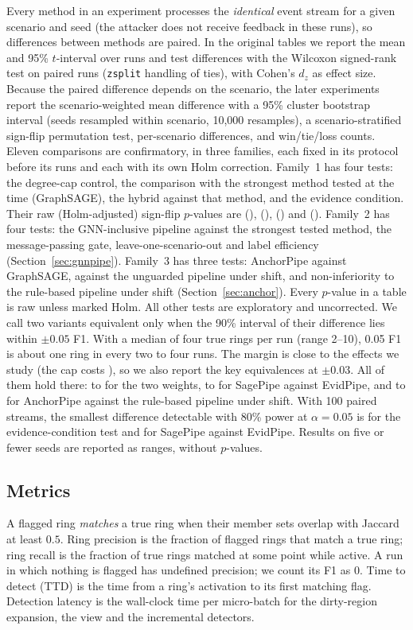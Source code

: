 Every method in an experiment processes the \emph{identical} event stream for a
given scenario and seed (the attacker does not receive feedback in these runs),
so differences between methods are paired. In the original tables we report
the mean and 95\% $t$-interval over runs and test differences with the
Wilcoxon signed-rank test on paired runs (\texttt{zsplit} handling of ties),
with Cohen's $d_z$ as effect size. Because the paired difference depends on the
scenario, the later experiments report the scenario-weighted mean difference
with a 95\% cluster bootstrap interval (seeds resampled within scenario,
10{,}000 resamples), a scenario-stratified sign-flip permutation test, per-scenario
differences, and win/tie/loss counts. Eleven comparisons are confirmatory, in three families, each fixed in its
protocol before its runs and each with its own Holm correction. Family~1 has
four tests: the degree-cap control, the comparison with the strongest method
tested at the time (GraphSAGE), the hybrid against that method, and the evidence condition. Their raw
(Holm-adjusted) sign-flip $p$-values are \RfRawCap{} (\RfHolmCap{}), \RfRawGnn{}
(\RfHolmGnn{}), \RfRawHy{} (\RfHolmHy{}) and \RfRawNd{} (\RfHolmNd{}). Family~2
has four tests: the GNN-inclusive pipeline against the strongest tested method,
the message-passing gate, leave-one-scenario-out and label efficiency
(Section~\ref{sec:gnnpipe}). Family~3 has three tests: AnchorPipe against
GraphSAGE, against the unguarded pipeline under shift, and non-inferiority to the
rule-based pipeline under shift (Section~\ref{sec:anchor}). Every $p$-value in a
table is raw unless marked Holm. All other tests are exploratory and
uncorrected. We call
two variants equivalent only when the 90\% interval of their difference lies
within $\pm0.05$ F1. With a median of four true rings per run (range 2--10), 0.05 F1 is about one
ring in every two to four runs. The margin is close to the effects we study (the
cap costs \RfCapD{}), so we also report the key equivalences at $\pm0.03$. All of
them hold there: \MgShapeLo{} to \MgShapeHi{} for the two weights,
\MgSageEvidLo{} to \MgSageEvidHi{} for SagePipe against EvidPipe, and
\MgAnchorPipeTLo{} to \MgAnchorPipeTHi{} for AnchorPipe against the rule-based
pipeline under shift. With 100 paired streams, the smallest difference
detectable with 80\% power at $\alpha=0.05$ is \MgNdPrimMde{} for the
evidence-condition test and \MgSageEvidMde{} for SagePipe against EvidPipe.
Results on five or fewer seeds are reported as ranges, without $p$-values.

\subsection{Metrics}
A flagged ring \emph{matches} a true ring when their member sets overlap with
Jaccard at least $0.5$. Ring precision is the fraction of flagged rings that
match a true ring; ring recall is the fraction of true rings matched at some
point while active. A run in which nothing is flagged has undefined precision;
we count its F1 as 0. Time to detect (TTD) is the time from a ring's
activation to its first matching flag. Detection latency is the wall-clock time
per micro-batch for the dirty-region expansion, the view and the incremental
detectors.

